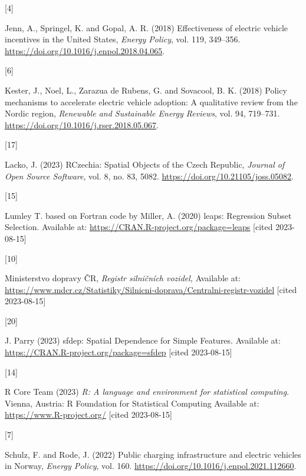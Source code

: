 \documentclass{mmeproc}
\newlength{\cslhangindent}
\newlength{\csllabelwidth}
\newenvironment{CSLReferences}[2] %
 {%
  \setlength{\parindent}{0pt}
  \ifodd #1
  \fi
  \setlength{\parskip}{-2pt}
 }%
 {}
\newcommand{\CSLLeftMargin}[1]{\parbox[t]{\csllabelwidth}{#1}}
\newcommand{\CSLRightInline}[1]{\parbox[t]{\linewidth - \csllabelwidth}{#1}\break}
\begin{document}
\begin{CSLReferences}{0}{0}
\leavevmode{}%
\CSLLeftMargin{{[}4{]} }%
\CSLRightInline{Jenn, A., Springel, K. and Gopal, A. R. (2018) {Effectiveness
of electric vehicle incentives in the {United} {States},} \emph{Energy
Policy}, vol. 119, 349--356. \url{https://doi.org/10.1016/j.enpol.2018.04.065}.}

\leavevmode{}%
\CSLLeftMargin{{[}6{]} }%
\CSLRightInline{Kester, J., Noel,  L., Zarazua de Rubens,  G. and 
Sovacool, B. K. (2018) {Policy mechanisms to accelerate electric vehicle adoption:
{A} qualitative review from the {Nordic} region,} \emph{Renewable and
Sustainable Energy Reviews}, vol. 94, 719--731. \url{https://doi.org/10.1016/j.rser.2018.05.067}.}

\leavevmode{}%
\CSLLeftMargin{{[}17{]} }%
\CSLRightInline{Lacko, J. (2023)  {{RCzechia}: {Spatial} {Objects} of the
{Czech} {Republic},} \emph{Journal of Open Source Software}, vol. 8,
no. 83, 5082. \url{https://doi.org/10.21105/joss.05082}.}

\leavevmode{}%
\CSLLeftMargin{{[}15{]} }%
\CSLRightInline{Lumley T. based on Fortran code by Miller, A. (2020)
{{leaps}: {Regression} {Subset} {Selection}.} Available at:
\url{https://CRAN.R-project.org/package=leaps} {{[}cited 2023-08-15{]}}}

\leavevmode{}%
\CSLLeftMargin{{[}10{]} }%
\CSLRightInline{Ministerstvo dopravy ČR, \emph{Registr silničních
vozidel,} Available at:
\url{https://www.mdcr.cz/Statistiky/Silnicni-doprava/Centralni-registr-vozidel} {{[}cited 2023-08-15{]}}}

\leavevmode{}%
\CSLLeftMargin{{[}20{]} }%
\CSLRightInline{J. Parry (2023) {{sfdep}: {Spatial} {Dependence} for
{Simple} {Features}.} Available at:
\url{https://CRAN.R-project.org/package=sfdep} {{[}cited 2023-08-15{]}}}

\leavevmode{}%
\CSLLeftMargin{{[}14{]} }%
\CSLRightInline{R Core Team (2023) \emph{R: A language and environment for
statistical computing}. Vienna, Austria: R Foundation for Statistical
Computing Available at: \url{https://www.R-project.org/} {{[}cited 2023-08-15{]}}}

\leavevmode{}%
\CSLLeftMargin{{[}7{]} }%
\CSLRightInline{Schulz, F. and Rode, J. (2022) {Public charging infrastructure
and electric vehicles in {Norway},} \emph{Energy Policy}, vol. 160. 
\url{https://doi.org/10.1016/j.enpol.2021.112660}.}


\end{CSLReferences}
\end{document}
